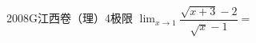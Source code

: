 
\begin{problem}{2008}{G}{江西卷（理）}{4}{极限}
$ \displaystyle \lim_{x \to 1} \dfrac{\sqrt{x+3} - 2}{\sqrt{x} - 1} = $
\begin{choices}
\end{choices}
\end{problem}

\begin{answer}

\end{answer}

\begin{solutions}

\end{solutions}